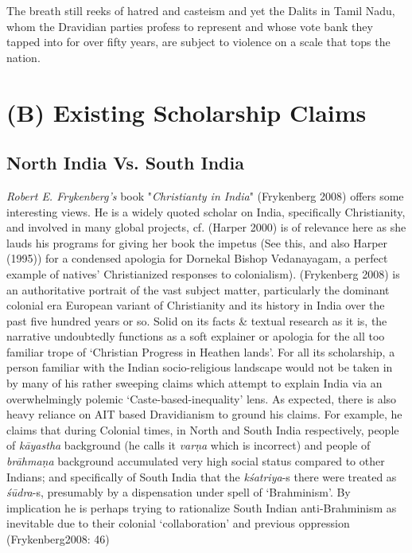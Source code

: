 The breath still reeks of hatred and casteism and yet the Dalits in Tamil Nadu, whom the Dravidian parties profess to represent and whose vote bank they tapped into for over fifty years, are subject to violence on a scale that tops the nation.



\section*{(B) Existing Scholarship Claims}

\subsection*{North India Vs. South India}

\textit{Robert E. Frykenberg’s} book "\textit{Christianty in India}" (Frykenberg 2008) offers some interesting views. He is a widely quoted scholar on India, specifically Christianity, and involved in many global projects, cf. (Harper 2000) is of relevance here as she lauds his programs for giving her book the impetus (See this, and also Harper (1995)) for a condensed apologia for Dornekal Bishop Vedanayagam, a perfect example of natives’ Christianized responses to colonialism). (Frykenberg 2008) is an authoritative portrait of the vast subject matter, particularly the dominant colonial era European variant of Christianity and its history in India over the past five hundred years or so. Solid on its facts \& textual research as it is, the narrative undoubtedly functions as a soft explainer or apologia for the all too familiar trope of ‘Christian Progress in Heathen lands’. For all its scholarship, a person familiar with the Indian socio-religious landscape would not be taken in by many of his rather sweeping claims which attempt to explain India via an overwhelmingly polemic ‘Caste-based-inequality’ lens. As expected, there is also heavy reliance on AIT based Dravidianism to ground his claims. For example, he claims that during Colonial times, in North and South India respectively, people of \textit{kāyastha} background (he calls it \textit{varṇa} which is incorrect) and people of \textit{brāhmaṇa} background accumulated very high social status compared to other Indians; and specifically of South India that the \textit{kśatriya}-s there were treated as \textit{śūdra}-s, presumably by a dispensation under spell of ‘Brahminism’. By implication he is perhaps trying to rationalize South Indian anti-Brahminism as inevitable due to their colonial ‘collaboration’ and previous oppression (Frykenberg2008: 46)


